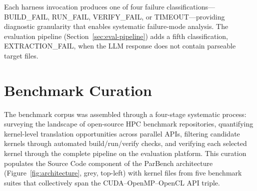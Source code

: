 \documentclass{article}
\newcommand{\verifyfail}{\textsc{VERIFY\_FAIL}}
\begin{document}
Each harness invocation produces one of four failure classifications---BUILD\_FAIL, RUN\_FAIL, VERIFY\_FAIL, or TIMEOUT---providing diagnostic granularity that enables systematic failure-mode analysis. The evaluation pipeline (Section~\ref{sec:eval-pipeline}) adds a fifth classification, EXTRACTION\_FAIL, when the LLM response does not contain parseable target files. %


\section{Benchmark Curation}
\label{sec:benchmark-curation}

The benchmark corpus was assembled through a four-stage systematic process: surveying the landscape of open-source HPC benchmark repositories, quantifying kernel-level translation opportunities across parallel APIs, filtering candidate kernels through automated build/run/verify checks, and verifying each selected kernel through the complete pipeline on the evaluation platform. This curation populates the Source Code component of the ParBench architecture (Figure~\ref{fig:architecture}, grey, top-left) with kernel files from five benchmark suites that collectively span the CUDA--OpenMP--OpenCL API triple.
\end{document}
